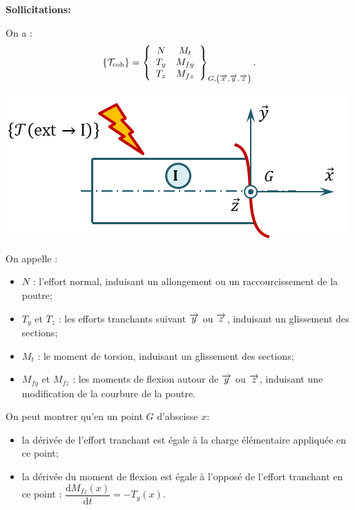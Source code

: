 \documentclass[10pt,fleqn]{article} %
\begin{document}
\begin{defi}
\textbf{Sollicitations:} ~\\

\begin{minipage}[c]{.65\linewidth}
On a : 
$$
\{\mathcal{T}_{\text{coh}}\} = \torseurcol{N}{T_y}{T_z}{M_t}{M_{fy}}{M_{fz}}{G,\left(\vx{}, \vy{}, \vz{} \right)}.
$$
\end{minipage} \hfill
\begin{minipage}[c]{.3\linewidth}
\begin{center}
\includegraphics[width=\linewidth]{images/sollicitations}
\end{center}
\end{minipage}

On appelle :
\begin{itemize}
\item $N$ : l'effort normal, induisant un allongement ou un raccourcissement de la poutre;
\item $T_y$ et $T_z$ : les efforts tranchants suivant $\vy{}$ ou $\vz{}$, induisant un glissement des sections;
\item $M_{t}$ : le moment de torsion, induisant un glissement des sections; 
\item $M_{fy}$ et $M_{fz}$ : les moments de flexion autour de $\vy{}$ ou $\vz{}$, induisant une modification de la courbure de la poutre.
\end{itemize}

\end{defi}


\begin{rem}
On peut montrer qu'en un point $G$ d'abscisse $x$:
\begin{itemize}
\item la dérivée de l'effort tranchant est égale à la charge élémentaire appliquée en ce point;
\item la dérivée du moment de flexion est égale à l'opposé de l'effort tranchant en ce point : $\dfrac{\text{d}M_{fz}(x)}{\text{d}t}=-T_y(x)$.
\end{itemize}
\end{rem}
\end{document}
